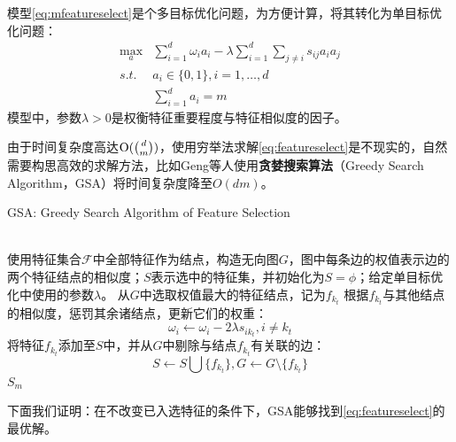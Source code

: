 模型\eqref{eq:mfeatureselect}是个多目标优化问题，为方便计算，将其转化为单目标优化问题：
\begin{equation}\label{eq:featureselect}
    \begin{array}{ll}
      \max\limits_a & \sum\limits_{i = 1}^d \omega_i a_i - \lambda\sum\limits_{i = 1}^d \sum\limits_{j \ne i} s_{ij} a_i a_j\\
      \textit{s.t.} & a_i\in \{0, 1\}, i = 1,\ldots, d\\
      & \sum\limits_{i=1}^d a_i= m
    \end{array}
\end{equation}
模型中，参数$\lambda >0$是权衡特征重要程度与特征相似度的因子。

由于时间复杂度高达$\operatorname{\mathrm{O}}(\binom{d}{m})$，使用穷举法求解\eqref{eq:featureselect}是不现实的，自然需要构思高效的求解方法，比如Geng等人使用\textbf{贪婪搜索算法}（Greedy Search Algorithm，GSA）将时间复杂度降至$O(dm)$\cite{geng2007feature}。
\begin{algorithm}[htbp]
        \caption{GSA: Greedy Search Algorithm of Feature Selection}
        \begin{algorithmic}[1]
           \REQUIRE ~~\\
            使用特征集合$\mathcal F$中全部特征作为结点，构造无向图$G$，图中每条边的权值表示边的两个特征结点的相似度；$S$表示选中的特征集，并初始化为$S = \phi$；给定单目标优化中使用的参数$\lambda$。
            \STATE 从$G$中选取权值最大的特征结点，记为$f_{k_t}$
            \STATE 根据$f_{k_t}$与其他结点的相似度，惩罚其余诸结点，更新它们的权重：
            \[ \omega_i \leftarrow \omega_i - 2\lambda s_{ik_t}, i \ne k_t\]
            \STATE 将特征$f_{k_t}$添加至$S$中，并从$G$中剔除与结点$f_{k_t}$有关联的边：
            \[ S \leftarrow S \bigcup \{f_{k_t}\}, G \leftarrow G \setminus \{f_{k_t}\} \]
            \ENDFOR
            \ENSURE $S_m$\\
        \end{algorithmic}
\end{algorithm}

下面我们证明\cite{geng2007feature}：在不改变已入选特征的条件下，GSA能够找到\eqref{eq:featureselect}的最优解。

